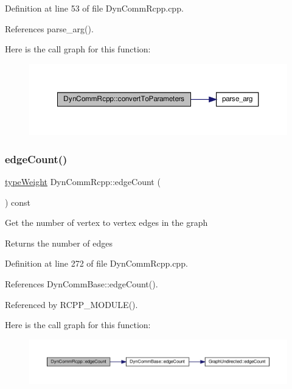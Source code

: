 Definition at line 53 of file Dyn\+Comm\+Rcpp.\+cpp.



References parse\+\_\+arg().

Here is the call graph for this function\+:
\nopagebreak
\begin{figure}[H]
\begin{center}
\leavevmode
\includegraphics[width=350pt]{classDynCommRcpp_a52692d421657ffcbe6a97762de9deddc_cgraph}
\end{center}
\end{figure}
\mbox{\label{classDynCommRcpp_aaa83772d4e3bc2407991116a196f3ce0}} 
\subsubsection{\texorpdfstring{edge\+Count()}{edgeCount()}}
{\footnotesize\ttfamily \hyperlink{edge_8h_a2e7ea3be891ac8b52f749ec73fee6dd2}{type\+Weight} Dyn\+Comm\+Rcpp\+::edge\+Count (\begin{DoxyParamCaption}{ }\end{DoxyParamCaption}) const\hspace{0.3cm}{\ttfamily [inline]}}

Get the number of vertex to vertex edges in the graph

\begin{DoxyReturn}{Returns}
the number of edges 
\end{DoxyReturn}


Definition at line 272 of file Dyn\+Comm\+Rcpp.\+cpp.



References Dyn\+Comm\+Base\+::edge\+Count().



Referenced by R\+C\+P\+P\+\_\+\+M\+O\+D\+U\+L\+E().

Here is the call graph for this function\+:
\nopagebreak
\begin{figure}[H]
\begin{center}
\leavevmode
\includegraphics[width=350pt]{classDynCommRcpp_aaa83772d4e3bc2407991116a196f3ce0_cgraph}
\end{center}
\end{figure}
\mbox{\label{classDynCommRcpp_a9a9aaf2512541f308d935e48c583f410}} 

